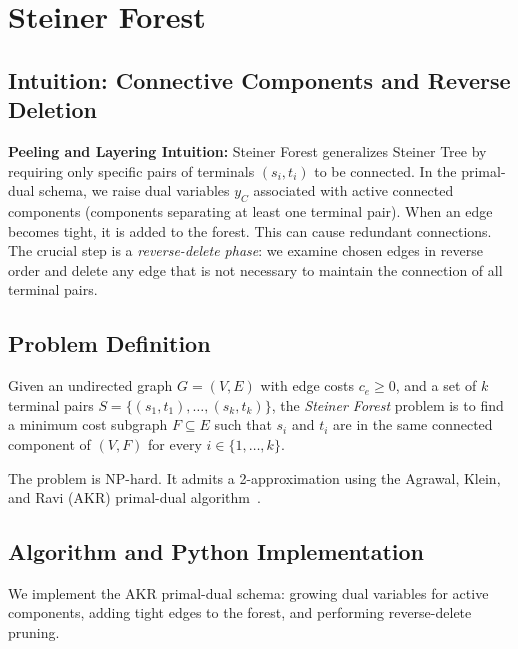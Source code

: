 \setcounter{chapter}{20}
\chapter{Steiner Forest}
\label{ch:steiner_forest}

\section{Intuition: Connective Components and Reverse Deletion}

\begin{intuitionbox}
\textbf{Peeling and Layering Intuition:} Steiner Forest generalizes Steiner Tree by requiring only specific pairs of terminals $(s_i, t_i)$ to be connected. In the primal-dual schema, we raise dual variables $y_C$ associated with active connected components (components separating at least one terminal pair). When an edge becomes tight, it is added to the forest. This can cause redundant connections. The crucial step is a \emph{reverse-delete phase}: we examine chosen edges in reverse order and delete any edge that is not necessary to maintain the connection of all terminal pairs.
\end{intuitionbox}

\section{Problem Definition}
Given an undirected graph $G = (V, E)$ with edge costs $c_e \ge 0$, and a set of $k$ terminal pairs $S = \{(s_1, t_1), \dots, (s_k, t_k)\}$, the \emph{Steiner Forest} problem is to find a minimum cost subgraph $F \subseteq E$ such that $s_i$ and $t_i$ are in the same connected component of $(V, F)$ for every $i \in \{1, \dots, k\}$.

The problem is NP-hard. It admits a 2-approximation using the Agrawal, Klein, and Ravi (AKR) primal-dual algorithm~\cite{agrawal-klein-ravi95}.

\section{Algorithm and Python Implementation}
We implement the AKR primal-dual schema: growing dual variables for active components, adding tight edges to the forest, and performing reverse-delete pruning.

